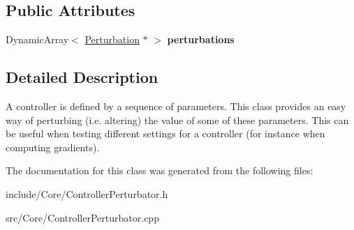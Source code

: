 \subsection*{Public Attributes}
\begin{DoxyCompactItemize}
\item 
\hypertarget{classCartWheel_1_1Core_1_1ControllerPerturbator_a375e2dd31457a2dbc95d9df063c0e1de}{
DynamicArray$<$ \hyperlink{classCartWheel_1_1Core_1_1Perturbation}{Perturbation} $\ast$ $>$ {\bfseries perturbations}}
\label{classCartWheel_1_1Core_1_1ControllerPerturbator_a375e2dd31457a2dbc95d9df063c0e1de}

\end{DoxyCompactItemize}


\subsection{Detailed Description}
A controller is defined by a sequence of parameters. This class provides an easy way of perturbing (i.e. altering) the value of some of these parameters. This can be useful when testing different settings for a controller (for instance when computing gradients). 

The documentation for this class was generated from the following files:\begin{DoxyCompactItemize}
\item 
include/Core/ControllerPerturbator.h\item 
src/Core/ControllerPerturbator.cpp\end{DoxyCompactItemize}
